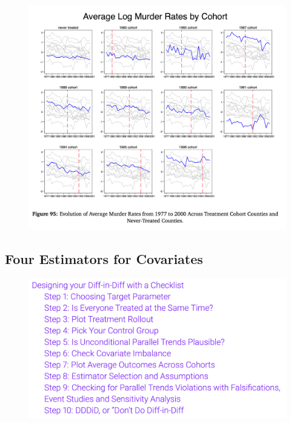 \documentclass{beamer}
\begin{document}
\begin{frame}

\begin{figure}
    \centering
    \includegraphics[height=0.85\textheight]{./lecture_includes/step7_outcomes}
\end{figure}

\end{frame}





\subsection{Four Estimators for Covariates}

\begin{frame}
 
\begin{figure}
    \centering
    \includegraphics[width=\textwidth]{./lecture_includes/checklist}
\end{figure}

\end{frame}
\end{document}
